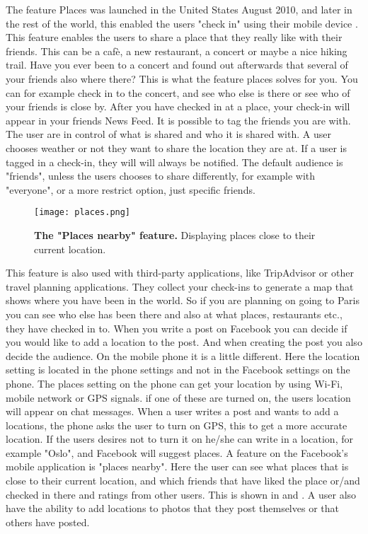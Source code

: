 The feature Places was launched in the United States August 2010, and later in the rest of the world, this enabled the users "check in" using their mobile device \cite{checkIn}. This feature enables the users to share a place that they really like with their friends. This can be a cafè, a new restaurant, a concert or maybe a nice hiking trail. Have you ever been to a concert and found out afterwards that several of your friends also where there? This is what the feature places solves for you. You can for example check in to the concert, and see who else is there or see who of your friends is close by. After you have checked in at a place, your check-in will appear in your friends News Feed. It is possible to tag the friends you are with. The user are in control of what is shared and who it is shared with. A user chooses weather or not they want to share the location they are at. If a user is tagged in a check-in, they will will always be notified. The default audience is "friends", unless the users chooses to share differently, for example with "everyone", or a more restrict option, just specific friends. 

\begin{figure}[t]
\centering
\texttt{[image: places.png]}
\caption [The "Places nearby" feature]{\textbf{The "Places nearby" feature.} Displaying places close to their current location.} 
\label{fig:places}
\end{figure}

This feature is also used with third-party applications, like TripAdvisor or other travel planning applications. They collect your check-ins to generate a map that shows where you have been in the world. So if you are planning on going to Paris you can see who else has been there and also at what places, restaurants etc., they have checked in to. 
When you write a post on Facebook you can decide if you would like to add a location to the post. And when creating the post you also decide the audience. On the mobile phone it is a little different. Here the location setting is located in the phone settings and not in the Facebook settings on the phone. The places setting on the phone can get your location by using Wi-Fi, mobile network or GPS signals. if one of these are turned on, the users location will appear on chat messages. When a user writes a post and wants to add a locations, the phone asks the user to turn on GPS, this to get a more accurate location. If the users desires not to turn it on he/she can write in a location, for example "Oslo", and Facebook will suggest places. A feature on the Facebook's mobile application is "places nearby". Here the user can see what places that is close to their current location, and which friends that have liked the place or/and checked in there and ratings from other users. This is shown in  and . A user also have the ability to add locations to photos that they post themselves or that others have posted. 


